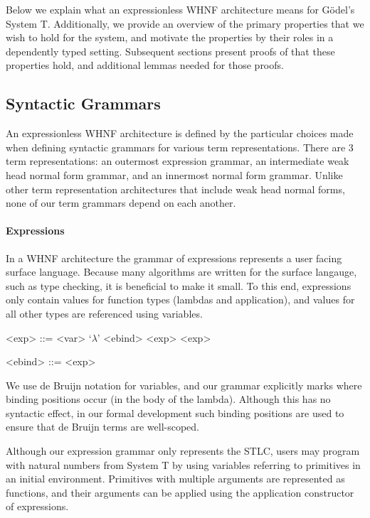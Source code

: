 \documentclass[preprint,authoryear]{sigplanconf}
\begin{document}
Below we explain what an expressionless WHNF
architecture means for G{\"o}del's System T.
Additionally, we provide an overview of the primary properties that we
wish to hold for the system, and motivate the properties by their roles in a
dependently typed setting. Subsequent sections present proofs of
that these properties hold, and additional lemmas needed for those
proofs.

\subsection{Syntactic Grammars}

An expressionless WHNF architecture is defined by the particular
choices made when defining syntactic grammars for various term
representations. There are 3 term representations: an outermost
expression grammar, an intermediate weak head normal form grammar, and
an innermost normal form grammar. Unlike other term
representation architectures that include weak head normal forms, none
of our term grammars depend on each another.

\paragraph{Expressions}

In a WHNF architecture the grammar of expressions represents a user
facing surface language. Because many algorithms are written for the
surface langauge, such as type checking, it is beneficial to make it
small. To this end, expressions only contain values for function types
(lambdas and application), and values for all other types are
referenced using variables.

\begin{grammar}
<exp> ::= <var> 
\alt `\(\lambda\)' <ebind>
\alt <exp> <exp>

<ebind> ::= <exp> 
\end{grammar}

We use de Bruijn notation for variables, and our grammar
explicitly marks where binding positions occur (in the body of the
lambda). Although this has no syntactic effect, in our formal
development such binding positions are used to ensure that de Bruijn
terms are well-scoped.

Although our expression grammar only represents the STLC, users may
program with natural numbers from System T by using variables
referring to primitives in an initial environment. Primitives with
multiple arguments are represented as functions, and their arguments
can be applied using the application constructor of expressions.
\end{document}
